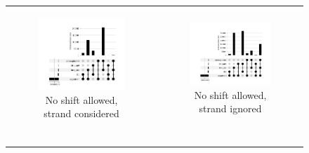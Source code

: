 \begin{figure}[ht]
    \begin{tabular}{cc}
        \begin{subfigure}{.5\textwidth}
            \centering

            \includegraphics[width=\linewidth]{chapters/4_results_and_discussion/figures/detection/min_samples_0/upset/diff_0_strand.png}
            \caption{No shift allowed, strand considered}
            \label{fig:detection_upset_full}
        \end{subfigure}
         &
        \begin{subfigure}{.5\textwidth}
            \centering

            \includegraphics[width=\linewidth]{chapters/4_results_and_discussion/figures/detection/min_samples_0/upset/diff_0_nostrand.png}
            \caption{No shift allowed, strand ignored}
            \label{fig:detection_upset_nostrand}
        \end{subfigure} \\
        \multicolumn{2}{c}{
            \begin{subfigure}{\textwidth}
                \centering


\end{subfigure}}
\end{tabular}
\end{figure}
